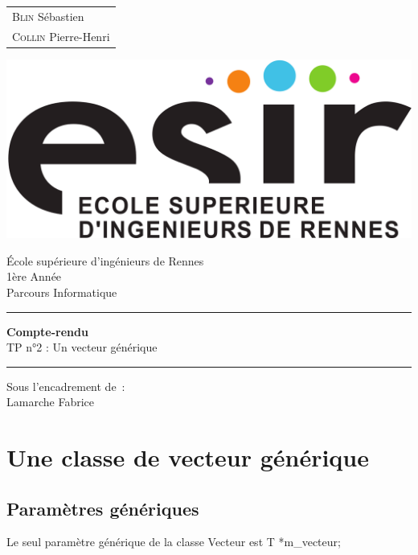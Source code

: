 \documentclass{article}
\begin{document}
\begin{titlepage}
	\vspace{-20px}
	\begin{tabular}{l}
		\textsc{Blin} S\'ebastien\\
		\textsc{Collin} Pierre-Henri
	\end{tabular}
	\hfill \vspace{10px}\includegraphics[scale=0.1]{esir}\\
	\vfill
	\begin{center}
		\Huge{\'Ecole sup\'erieure d'ing\'enieurs de Rennes}\\
		\vspace{1cm}
		\LARGE{1\`ere Ann\'ee}\\
		\large{Parcours Informatique}\\
		\vspace{0.5cm}\hrule\vspace{0.5cm}
		\LARGE{\textbf{Compte-rendu}}\\
		\Large{TP n°2 : Un vecteur g\'en\'erique}
		\vspace{0.5cm}\hrule
		\vfill
		\vfill
	\end{center}
	\begin{flushleft}
		\Large{Sous l'encadrement de~:}\\
		\vspace{0.2cm}
		\large{{Lamarche} Fabrice}
	\end{flushleft}
	\vfill
\end{titlepage}

\section{Une classe de vecteur g\'en\'erique}
\subsection{Param\`etres g\'en\'eriques}
Le seul param\`etre g\'en\'erique de la classe Vecteur est T *m\_vecteur; 
\end{document}
